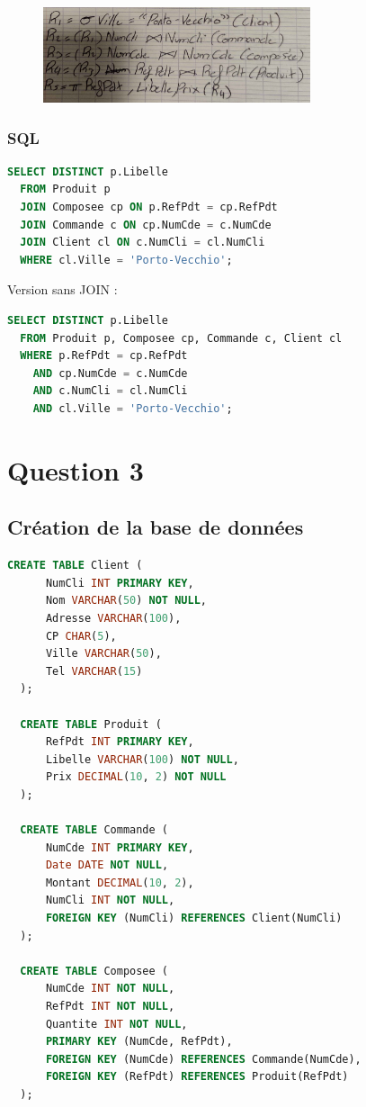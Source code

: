 \documentclass{article}
\begin{document}
\begin{figure}[H]
  \centering
  \includegraphics[width=0.7\textwidth]{alg/10.png}
  \label{fig:alg-rel}
\end{figure}

\subsubsection{SQL}

\begin{lstlisting}[language=SQL]
  SELECT DISTINCT p.Libelle 
  FROM Produit p
  JOIN Composee cp ON p.RefPdt = cp.RefPdt
  JOIN Commande c ON cp.NumCde = c.NumCde
  JOIN Client cl ON c.NumCli = cl.NumCli
  WHERE cl.Ville = 'Porto-Vecchio';
\end{lstlisting}

Version sans JOIN :

\begin{lstlisting}[language=SQL]
  SELECT DISTINCT p.Libelle 
  FROM Produit p, Composee cp, Commande c, Client cl
  WHERE p.RefPdt = cp.RefPdt 
    AND cp.NumCde = c.NumCde 
    AND c.NumCli = cl.NumCli 
    AND cl.Ville = 'Porto-Vecchio';
\end{lstlisting}

\break\section{Question 3}

\subsection{Création de la base de données}

\begin{lstlisting}[language=SQL]
  CREATE TABLE Client (
      NumCli INT PRIMARY KEY, 
      Nom VARCHAR(50) NOT NULL, 
      Adresse VARCHAR(100), 
      CP CHAR(5), 
      Ville VARCHAR(50), 
      Tel VARCHAR(15)
  );
  
  CREATE TABLE Produit (
      RefPdt INT PRIMARY KEY, 
      Libelle VARCHAR(100) NOT NULL, 
      Prix DECIMAL(10, 2) NOT NULL
  );
  
  CREATE TABLE Commande (
      NumCde INT PRIMARY KEY, 
      Date DATE NOT NULL, 
      Montant DECIMAL(10, 2), 
      NumCli INT NOT NULL, 
      FOREIGN KEY (NumCli) REFERENCES Client(NumCli)
  );
  
  CREATE TABLE Composee (
      NumCde INT NOT NULL, 
      RefPdt INT NOT NULL, 
      Quantite INT NOT NULL, 
      PRIMARY KEY (NumCde, RefPdt), 
      FOREIGN KEY (NumCde) REFERENCES Commande(NumCde), 
      FOREIGN KEY (RefPdt) REFERENCES Produit(RefPdt)
  );
\end{lstlisting}
\end{document}
